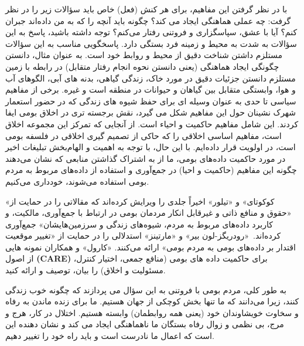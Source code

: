 با در نظر گرفتن این مفاهیم، برای هر کنش (فعل) خاص باید سؤالات زیر را در نظر گرفت: چه عملی هماهنگی ایجاد می کند؟ چگونه باید آنچه را که به من داده‌اند جبران کنم؟ آیا با عشق، سپاسگزاری و فروتنی رفتار می‌کنم؟ توجه داشته باشید، پاسخ به این سؤالات به شدت به محیط و زمینه فرد بستگی دارد.
پاسخگویی مناسب به این سؤالات مستلزم داشتن شناخت دقیق از محیط و روابط خود است.
به عنوان مثال، دانستن چگونگی ایجاد هماهنگی (یعنی دانستن نحوه انجام رفتار متقابل) در رابطه با زمین مستلزم دانستن جزئیات دقیق در مورد خاک، زندگی گیاهی، بدنه های آبی، الگوهای آب و هوا، وابستگی متقابل بین گیاهان و حیوانات در منطقه است و غیره.
برخی از مفاهیم سیاسی تا حدی به عنوان وسیله ای برای حفظ شیوه های زندگی که در حضور استعمار شهرک نشینان حول این مفاهیم شکل می گیرد، نقش برجسته تری در اخلاق بومی ایفا کردند.
این شامل مفاهیم حاکمیت و احیاء است.
از آنجایی که تمرکز این مجموعه اخلاق است، مفاهیم اساسی اخلاقی را که حاکی از تصمیم گیری اخلاقی در فلسفه بومی است، در اولویت قرار داده‌ایم.
با این حال، با توجه به اهمیت و الهام‌بخش تبلیغات اخیر در مورد حاکمیت داده‌های بومی، ما از به اشتراک گذاشتن منابعی که نشان می‌دهند چگونه این مفاهیم (حاکمیت و احیا) در جمع‌آوری و استفاده از داده‌های مربوط به مردم بومی استفاده می‌شوند، خودداری می‌کنیم.

«کوکوتای» و «تیلور» اخیراً جلدی را ویرایش کرده‌اند که مقالاتی را در حمایت از «حقوق و منافع ذاتی و غیرقابل انکار مردمان بومی در ارتباط با جمع‌آوری، مالکیت، و کاربرد داده‌های مربوط به مردم، شیوه‌های زندگی و سرزمین‌هایشان» جمع‌آوری کرده‌اند.\ «رودریگز-لون بیر» و «مارتینز» استدلالی را در حمایت از «تغییر موقعیت اقتدار بر داده‌های بومی به مردم بومی» ارائه می‌کنند.
«کارول» و همکاران نمونه هایی از اصول \textenglish{\textbf{(CARE)}}  برای حاکمیت داده های بومی (منافع جمعی، اختیار کنترل، مسئولیت و اخلاق) را بیان، توصیف و ارائه کنید.

به طور کلی، مردم بومی با فروتنی به این سؤال می پردازند که چگونه خوب زندگی کنند، زیرا می‌دانند که ما تنها بخش کوچکی از جهان هستیم.
ما برای زنده ماندن به رفاه و سخاوت خویشاوندان خود (یعنی همه روابطمان) وابسته هستیم.
اختلال در کار، هرج و مرج، بی نظمی و زوال رفاه بستگان ما ناهماهنگی ایجاد می کند و نشان دهنده این است که اعمال ما نادرست است و باید راه خود را تغییر دهیم.



